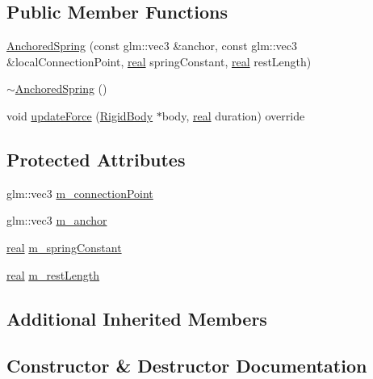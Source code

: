 \subsection*{Public Member Functions}
\begin{DoxyCompactItemize}
\item 
\mbox{\hyperlink{classr3_1_1_anchored_spring_a944423598dfb2e3f080f9f9850c8aa13}{Anchored\+Spring}} (const glm\+::vec3 \&anchor, const glm\+::vec3 \&local\+Connection\+Point, \mbox{\hyperlink{namespacer3_ab2016b3e3f743fb735afce242f0dc1eb}{real}} spring\+Constant, \mbox{\hyperlink{namespacer3_ab2016b3e3f743fb735afce242f0dc1eb}{real}} rest\+Length)
\item 
\mbox{\hyperlink{classr3_1_1_anchored_spring_afe612722d8ed0d7a6f0058dcc21eb17f}{$\sim$\+Anchored\+Spring}} ()
\item 
void \mbox{\hyperlink{classr3_1_1_anchored_spring_a3e928bc7fdedc8eb5b302a007200a58c}{update\+Force}} (\mbox{\hyperlink{classr3_1_1_rigid_body}{Rigid\+Body}} $\ast$body, \mbox{\hyperlink{namespacer3_ab2016b3e3f743fb735afce242f0dc1eb}{real}} duration) override
\end{DoxyCompactItemize}
\subsection*{Protected Attributes}
\begin{DoxyCompactItemize}
\item 
glm\+::vec3 \mbox{\hyperlink{classr3_1_1_anchored_spring_ac8998ca820fd075aed011136155ec1fb}{m\+\_\+connection\+Point}}
\item 
glm\+::vec3 \mbox{\hyperlink{classr3_1_1_anchored_spring_a1387aec403f6955848fe8c3a28b90a9e}{m\+\_\+anchor}}
\item 
\mbox{\hyperlink{namespacer3_ab2016b3e3f743fb735afce242f0dc1eb}{real}} \mbox{\hyperlink{classr3_1_1_anchored_spring_af17c024b5f8a025f5555946c60b52a67}{m\+\_\+spring\+Constant}}
\item 
\mbox{\hyperlink{namespacer3_ab2016b3e3f743fb735afce242f0dc1eb}{real}} \mbox{\hyperlink{classr3_1_1_anchored_spring_a17441401eb79dd8244a4739a3a574d1a}{m\+\_\+rest\+Length}}
\end{DoxyCompactItemize}
\subsection*{Additional Inherited Members}


\subsection{Constructor \& Destructor Documentation}
\mbox{\label{classr3_1_1_anchored_spring_a944423598dfb2e3f080f9f9850c8aa13}} 
